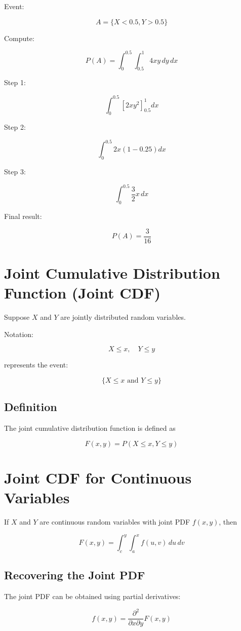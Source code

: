 \documentclass{article}
\begin{document}
Event:

\[
A=\{X<0.5,Y>0.5\}
\]

Compute:

\[
P(A)=\int_0^{0.5}\int_{0.5}^{1}4xy\,dy\,dx
\]

Step 1:

\[
\int_0^{0.5}[2xy^2]_{0.5}^{1}dx
\]

Step 2:

\[
\int_0^{0.5}2x(1-0.25)dx
\]

Step 3:

\[
\int_0^{0.5}\frac{3}{2}x\,dx
\]

Final result:

\[
P(A)=\frac{3}{16}
\]

\section{Joint Cumulative Distribution Function (Joint CDF)}

Suppose $X$ and $Y$ are jointly distributed random variables.

Notation:

\[
X\le x,\quad Y\le y
\]

represents the event:

\[
\{X\le x \text{ and } Y\le y\}
\]

\subsection*{Definition}

The joint cumulative distribution function is defined as

\[
F(x,y)=P(X\le x,Y\le y)
\]

\section{Joint CDF for Continuous Variables}

If $X$ and $Y$ are continuous random variables with joint PDF $f(x,y)$, then

\[
F(x,y)=\int_c^y\int_a^x f(u,v)\,du\,dv
\]

\subsection*{Recovering the Joint PDF}

The joint PDF can be obtained using partial derivatives:

\[
f(x,y)=\frac{\partial^2}{\partial x\partial y}F(x,y)
\]
\end{document}
